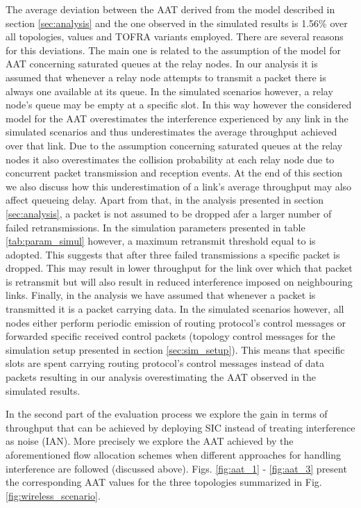 \documentclass[conference]{IEEEtran}
\begin{document}
The average deviation between the AAT derived from the model described in section \ref{sec:analysis} and
the one observed in the simulated results is 1.56\% over all topologies,  values and TOFRA variants employed.
There are several reasons for this deviations.
The main one is related to the assumption of the model for AAT concerning saturated queues at the relay nodes.
In our analysis it is assumed that whenever a relay node attempts to transmit a packet there is always one available at its queue.
In the simulated scenarios however, a relay node's queue may be empty at a specific slot.
In this way however the considered model for the AAT overestimates the interference experienced by any link in the simulated scenarios
and thus underestimates the average throughput achieved over that link. Due to the assumption concerning saturated queues at the relay nodes
it also overestimates the collision probability at each relay node due to concurrent packet transmission and reception events. 
At the end of this section we also discuss how this underestimation of a link's average throughput may also affect queueing delay.
Apart from that, in the analysis presented in section \ref{sec:analysis}, a packet is not assumed to be dropped afer a larger number of
failed retransmissions. In the simulation parameters presented in table \ref{tab:param_simul} however, a maximum retransmit threshold equal to 
is adopted. This suggests that after three failed transmissions a specific packet is dropped. This may result in lower throughput for the
link over which that packet is retransmit but will also result in reduced interference imposed on neighbouring links. Finally,
in the analysis we have assumed that whenever a packet is transmitted it is a packet carrying data.
In the simulated scenarios however, all nodes either perform periodic emission of routing protocol's control messages or forwarded specific
received control packets (topology control messages for the simulation setup presented in section \ref{sec:sim_setup}).
This means that specific slots are spent carrying routing protocol's control messages instead of data packets resulting
in our analysis overestimating the AAT observed in the simulated results.

In the second part of the evaluation process we explore the gain in terms of throughput that can be achieved by deploying
SIC instead of treating interference as noise (IAN).
More precisely we explore the AAT achieved by the aforementioned flow allocation schemes when different approaches
for handling interference are followed (discussed above). Figs. \ref{fig:aat_1} - \ref{fig:aat_3} present the corresponding AAT values for the three topologies
summarized in Fig. \ref{fig:wireless_scenario}.
\end{document}
